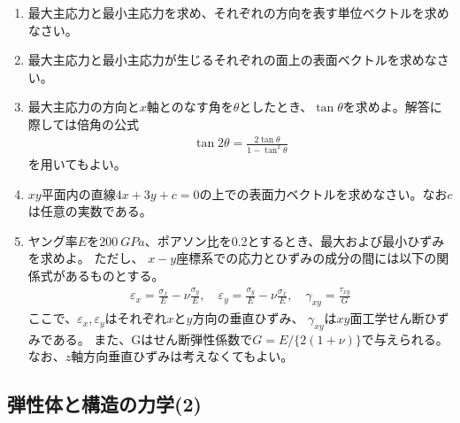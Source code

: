 {  \begin{enumerate}[label=(\arabic*)]
    \item 最大主応力と最小主応力を求め、それぞれの方向を表す単位ベクトルを求めなさい。
    \item 最大主応力と最小主応力が生じるそれぞれの面上の表面ベクトルを求めなさい。
    \item 最大主応力の方向と$x$軸とのなす角を$\theta$としたとき、$\tan \theta$を求めよ。解答に際しては倍角の公式
          \begin{align*}%
            \tan 2\theta = \frac{2\tan \theta}{1 - \tan^2 \theta}
          \end{align*}
          を用いてもよい。
    \item $xy$平面内の直線$4x + 3y +c = 0$の上での表面力ベクトルを求めなさい。なお$c$は任意の実数である。
    \item ヤング率$E$を$\SI{200}{GPa}$、ポアソン比を0.2とするとき、最大および最小ひずみを求めよ。
          ただし、
          $x-y$座標系での応力とひずみの成分の間には以下の関係式があるものとする。
          \begin{align*}%
            \varepsilon_x = \frac{\sigma_x}{E}-\nu\frac{\sigma_y}{E},\quad
            \varepsilon_y = \frac{\sigma_y}{E}-\nu\frac{\sigma_x}{E},\quad
            \gamma_{xy} = \frac{\tau_{xy}}{G}
          \end{align*}
          ここで、$\varepsilon_x$,\,$\varepsilon_y$はそれぞれ$x$と$y$方向の垂直ひずみ、
          $\gamma_{xy}$は$xy$面工学せん断ひずみである。
          また、Gはせん断弾性係数で$G=E/\{2(1+\nu)\}$で与えられる。
          なお、$z$軸方向垂直ひずみは考えなくてもよい。
  \end{enumerate}
}

\subsection{弾性体と構造の力学(2)}
